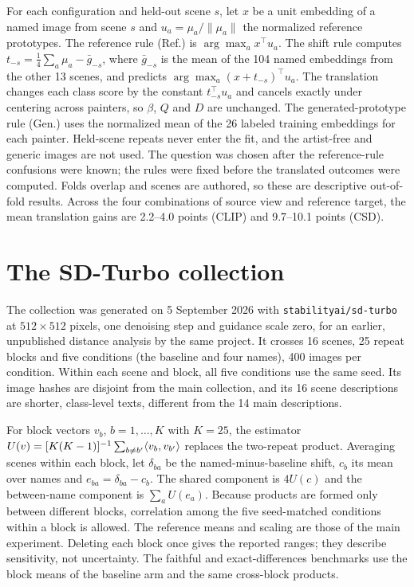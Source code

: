 For each configuration and held-out scene $s$, let $x$ be a unit embedding of a named image
from scene $s$ and $u_a=\mu_a/\|\mu_a\|$ the normalized reference prototypes. The reference rule
(Ref.) is $\arg\max_a x^\top u_a$. The shift rule computes $t_{-s}=\frac14\sum_a\mu_a-\bar
g_{-s}$, where $\bar g_{-s}$ is the mean of the 104 named embeddings from the other 13 scenes,
and predicts $\arg\max_a(x+t_{-s})^\top u_a$. The translation changes each class score by the
constant $t_{-s}^\top u_a$ and cancels exactly under centering across painters, so $\beta$, $Q$
and $D$ are unchanged. The generated-prototype rule (Gen.) uses the normalized mean of the 26
labeled training embeddings for each painter. Held-scene repeats never enter the fit, and the
artist-free and generic images are not used. The question was chosen after the reference-rule
confusions were known; the rules were fixed before the translated outcomes were computed. Folds
overlap and scenes are authored, so these are descriptive out-of-fold results. Across the four
combinations of source view and reference target, the mean translation gains are 2.2--4.0
points (CLIP) and 9.7--10.1 points (CSD).

\FloatBarrier
\section{The SD-Turbo collection}\label{app:sdturbo}

The collection was generated on 5 September 2026 with \texttt{stabilityai/sd-turbo} at
$512\times512$ pixels, one denoising step and guidance scale zero, for an earlier, unpublished
distance analysis by the same project. It crosses 16 scenes, 25 repeat blocks and five
conditions (the baseline and four names), 400 images per condition. Within each scene and
block, all five conditions use the same seed. Its image hashes are disjoint from the main
collection, and its 16 scene descriptions are shorter, class-level texts, different from the 14
main descriptions.

For block vectors $v_b$, $b=1,\dots,K$ with $K=25$, the estimator
$U(v)=[K(K-1)]^{-1}\sum_{b\ne b'}\langle v_b,v_{b'}\rangle$ replaces the two-repeat product. Averaging
scenes within each block, let $\delta_{ba}$ be the named-minus-baseline shift, $c_b$ its mean
over names and $e_{ba}=\delta_{ba}-c_b$. The shared component is $4U(c)$ and the between-name
component is $\sum_aU(e_a)$. Because products are formed only between different blocks,
correlation among the five seed-matched conditions within a block is allowed. The reference
means and scaling are those of the main experiment. Deleting each block once gives the reported
ranges; they describe sensitivity, not uncertainty. The faithful and exact-differences benchmarks use
the block means of the baseline arm and the same cross-block products.

